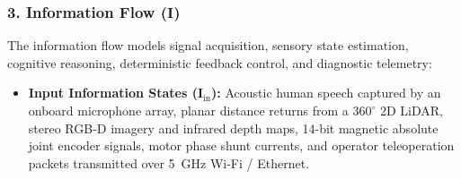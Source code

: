 \subsubsection{3. Information Flow \texorpdfstring{($\mathbf{I}$)}{(I)}}
The information flow models signal acquisition, sensory state estimation, cognitive reasoning, deterministic feedback control, and diagnostic telemetry:
\begin{itemize}[leftmargin=1.5em]
  \item \textbf{Input Information States ($\mathbf{I}_{\text{in}}$):}
  Acoustic human speech captured by an onboard microphone array, planar distance returns from a $360^\circ$ 2D LiDAR, stereo RGB-D imagery and infrared depth maps, 14-bit magnetic absolute joint encoder signals, motor phase shunt currents, and operator teleoperation packets transmitted over 5~GHz Wi-Fi / Ethernet.
  

\end{itemize}
